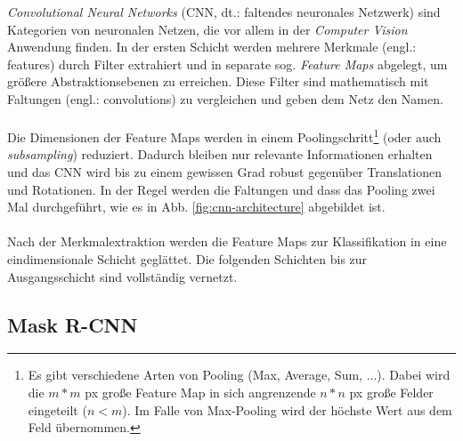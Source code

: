\noindent 
\textit{Convolutional Neural Networks} (CNN, dt.: faltendes neuronales Netzwerk) sind Kategorien von neuronalen Netzen, die vor allem in der \textit{Computer Vision} Anwendung finden. In der ersten Schicht werden mehrere Merkmale (engl.: features) durch Filter extrahiert und in separate sog. \textit{Feature Maps} abgelegt, um größere Abstraktionsebenen zu erreichen. Diese Filter sind mathematisch mit Faltungen (engl.: convolutions) zu vergleichen und geben dem Netz den Namen. 
\\\\
Die Dimensionen der Feature Maps werden in einem Poolingschritt\footnote{Es gibt verschiedene Arten von Pooling (Max, Average, Sum, ...). Dabei wird die $m*m$ px große Feature Map in sich angrenzende $n*n$ px große Felder eingeteilt ($n<m$). Im Falle von Max-Pooling wird der höchste Wert aus dem Feld übernommen.} (oder auch \textit{subsampling}) reduziert. Dadurch bleiben nur relevante Informationen erhalten und das CNN wird bis zu einem gewissen Grad robust gegenüber Translationen und Rotationen. In der Regel werden die Faltungen und dass das Pooling zwei Mal durchgeführt, wie es in Abb. \ref{fig:cnn-architecture} abgebildet ist.
\\\\
Nach der Merkmalextraktion werden die Feature Maps zur Klassifikation in eine eindimensionale Schicht geglättet. Die folgenden Schichten bis zur Ausgangsschicht sind vollständig vernetzt.

\subsection{Mask R-CNN}\label{sec:sub:mask-rcnn}

